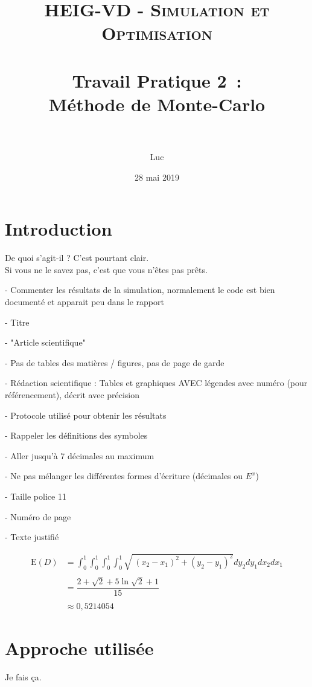 \documentclass[paper=a4, fontsize=11pt]{scrartcl}
\title{
  \normalfont \normalsize
  \textsc{HEIG-VD - Simulation et Optimisation} \\[10pt]
  \horrule{1pt} \\[0.4cm] %
  \huge Travail Pratique 2~:\\Méthode de Monte-Carlo \\
  \horrule{2pt} \\[0.4cm] %
}
\author{Luc \bsc{Wachter}}
\date{28 mai 2019}
\begin{document}
\lstset{language=Java}

\maketitle

\section{Introduction}
De quoi s'agit-il ? C'est pourtant clair.
\\
Si vous ne le savez pas, c'est que vous n'êtes pas prêts.

- Commenter les résultats de la simulation, normalement le code est bien documenté et apparait peu dans le rapport

- Titre

-  "Article scientifique"

- Pas de tables des matières / figures, pas de page de garde

- Rédaction scientifique : Tables et graphiques AVEC légendes avec numéro (pour référencement), décrit avec précision

- Protocole utilisé pour obtenir les résultats

- Rappeler les définitions des symboles

- Aller jusqu'à 7 décimales au maximum

- Ne pas mélanger les différentes formes d'écriture (décimales ou $E^x$)

- Taille police 11

- Numéro de page

- Texte justifié


\begin{align*}
  \text{E}(D) &= \int _0^1\int _0^1\int _0^1\int _0^1\sqrt{\:\left(x_2-x_1\right)^2+\left(y_2-y_1\right)^2}dy_2dy_1dx_2dx_1 \\ \\
  &= \dfrac{2 + \sqrt{2} + 5\ln{\sqrt{2} + 1}}{15} \\ \\
  &\approx 0,5214054
\end{align*}

\newpage

\section{Approche utilisée}
Je fais ça.
\end{document}
